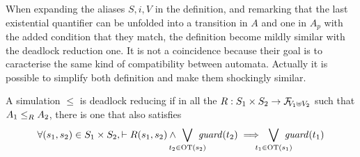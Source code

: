 \documentclass{article}
\begin{document}
When expanding the aliases \(S, i, V\) in the definition, and remarking that the last existential quantifier can be unfolded into a transition in \(A\) and one in \(A_p\) with the added condition that they match, the definition become mildly similar with the deadlock reduction one.
It is not a coincidence because their goal is to caracterise the same kind of compatibility between automata.
Actually it is possible to simplify both definition and make them shockingly similar.

\begin{defi}
A simulation \(\leq\) is deadlock reducing if in all the \(R: S_1 \times S_2 \to \rformulae[V_1 \uplus V_2]\) such that \(\wrel{A_1}{A_2}{R}\), there is one that also satisfies
\[ \forall \mpar{s_1, s_2} \in S_1 \times S_2, \vdash R\mpar{s_1, s_2} \wedge \bigvee_\subbox{t_2 \in \fOT{s_2}} \fguard{t_2} \implies \bigvee_\subbox{t_1 \in \fOT{s_1}} \fguard{t_1} \]
\end{defi}
\end{document}
